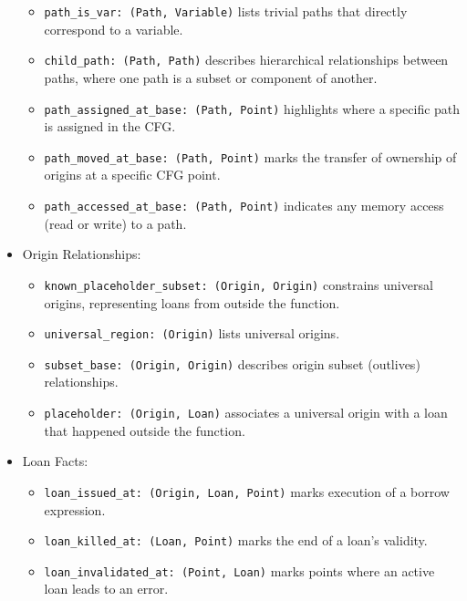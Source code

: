 \documentclass[
  11pt,
  twoside,symmetric]{report}
\providecommand{\tightlist}{%
  \setlength{\itemsep}{0pt}\setlength{\parskip}{0pt}}
\begin{document}
\begin{itemize}
  \begin{itemize}
  \tightlist
  \item
    \texttt{path\_is\_var:\ (Path,\ Variable)} lists trivial paths that
    directly correspond to a variable.
  \item
    \texttt{child\_path:\ (Path,\ Path)} describes hierarchical
    relationships between paths, where one path is a subset or component
    of another.
  \item
    \texttt{path\_assigned\_at\_base:\ (Path,\ Point)} highlights where
    a specific path is assigned in the CFG.
  \item
    \texttt{path\_moved\_at\_base:\ (Path,\ Point)} marks the transfer
    of ownership of origins at a specific CFG point.
  \item
    \texttt{path\_accessed\_at\_base:\ (Path,\ Point)} indicates any
    memory access (read or write) to a path.
  \end{itemize}
\item
  Origin Relationships:

  \begin{itemize}
  \tightlist
  \item
    \texttt{known\_placeholder\_subset:\ (Origin,\ Origin)} constrains
    universal origins, representing loans from outside the function.
  \item
    \texttt{universal\_region:\ (Origin)} lists universal origins.
  \item
    \texttt{subset\_base:\ (Origin,\ Origin)} describes origin subset
    (outlives) relationships.
  \item
    \texttt{placeholder:\ (Origin,\ Loan)} associates a universal origin
    with a loan that happened outside the function.
  \end{itemize}
\item
  Loan Facts:

  \begin{itemize}
  \tightlist
  \item
    \texttt{loan\_issued\_at:\ (Origin,\ Loan,\ Point)} marks execution
    of a borrow expression.
  \item
    \texttt{loan\_killed\_at:\ (Loan,\ Point)} marks the end of a loan's
    validity.
  \item
    \texttt{loan\_invalidated\_at:\ (Point,\ Loan)} marks points where
    an active loan leads to an error.
  \end{itemize}
\end{itemize}
\end{document}
